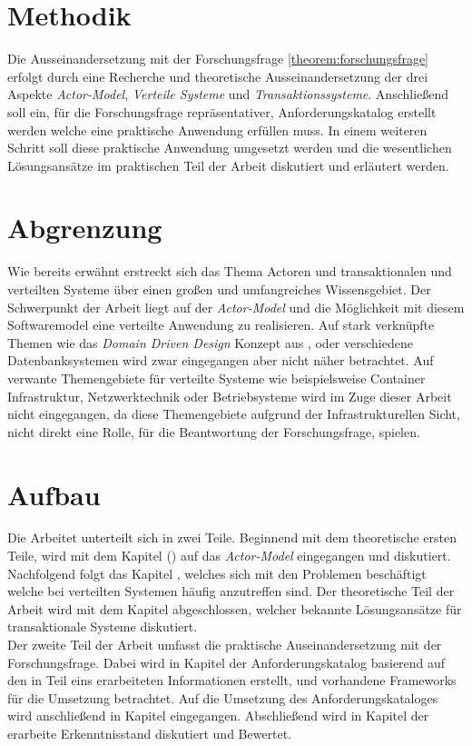 \section{Methodik}
Die Ausseinandersetzung mit der Forschungsfrage \ref{theorem:forschungsfrage} erfolgt durch eine Recherche und theoretische Ausseinandersetzung der drei Aspekte \textit{Actor-Model}, \textit{Verteile Systeme} und \textit{Transaktionssysteme}. Anschließend soll ein, für die Forschungsfrage repräsentativer, Anforderungskatalog erstellt werden welche eine praktische Anwendung erfüllen muss. In einem weiteren Schritt soll diese praktische Anwendung umgesetzt werden und die wesentlichen Lösungsansätze im praktischen Teil der Arbeit diskutiert und erläutert werden. 

\section{Abgrenzung}
Wie bereits erwähnt erstreckt sich das Thema Actoren und transaktionalen und verteilten Systeme über einen großen und umfangreiches Wissensgebiet. Der Schwerpunkt der Arbeit liegt auf der \textit{Actor-Model} und die Möglichkeit mit diesem Softwaremodel eine verteilte Anwendung zu realisieren. Auf stark verknüpfte Themen wie das \textit{Domain Driven Design} Konzept aus \cite{Evans2004Domain-drivenSoftware}, oder verschiedene Datenbanksystemen wird zwar eingegangen aber nicht näher betrachtet. Auf verwante Themengebiete für verteilte Systeme wie beispielsweise Container Infrastruktur, Netzwerktechnik oder Betriebsysteme wird im Zuge dieser Arbeit nicht eingegangen, da diese Themengebiete aufgrund der Infrastrukturellen Sicht, nicht direkt eine Rolle, für die Beantwortung der Forschungsfrage, spielen. 

\section{Aufbau}
Die Arbeitet unterteilt sich in zwei Teile. Beginnend mit dem theoretische ersten Teile, wird mit dem Kapitel  () auf das \textit{Actor-Model} eingegangen und diskutiert. Nachfolgend folgt das Kapitel , welches sich mit den Problemen beschäftigt welche bei verteilten Systemen häufig anzutreffen sind. Der theoretische Teil der Arbeit wird mit dem Kapitel  abgeschlossen, welcher bekannte Lösungsansätze für transaktionale Systeme diskutiert. \\
Der zweite Teil der Arbeit umfasst die praktische Auseinandersetzung mit der Forschungsfrage. Dabei wird in Kapitel  der Anforderungskatalog basierend auf den in Teil eins erarbeiteten Informationen erstellt, und vorhandene Frameworks für die Umsetzung betrachtet. Auf die Umsetzung des Anforderungskataloges wird anschließend in Kapitel  eingegangen. Abschließend wird in Kapitel  der erarbeite Erkenntnisstand diskutiert und Bewertet. 